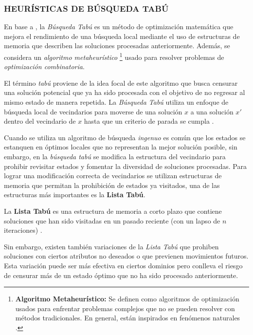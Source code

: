 \subsubsection{HEURÍSTICAS DE BÚSQUEDA TABÚ}

En base a \parencite{Gendreau2003}, la \textit{Búsqueda Tabú} es un método de optimización matemática que mejora el rendimiento de una búsqueda local mediante el uso de estructuras de memoria que describen las soluciones procesadas anteriormente. Además, se considera un \textit{algoritmo metaheurístico} \footnote{\textbf{Algoritmo Metaheurístico: }Se definen como algoritmos de optimización usados para enfrentar problemas complejos que no se pueden resolver con métodos tradicionales. En general, están inspirados en fenómenos naturales \parencite{almufti2023overview}.} usado para resolver problemas de \textit{optimización combinatoria}.

El término \textit{tabú} proviene de la idea focal de este algoritmo que busca censurar una solución potencial que ya ha sido procesada con el objetivo de no regresar al mismo estado de manera repetida. La \textit{Búsqueda Tabú} utiliza un enfoque de búsqueda local de vecindarios para moverse de una solución $x$ a una solución $x'$ dentro del vecindario de $x$ hasta que un criterio de parada se cumpla \parencite{Cvijović2002}. 

Cuando se utiliza un algoritmo de búsqueda \textit{ingenuo} es común que los estados se estanquen en óptimos locales que no representan la mejor solución posible, sin embargo, en la \textit{búsqueda tabú} se modifica la estructura del vecindario para prohibir revisitar estados y fomentar la diversidad de soluciones procesadas. Para lograr una modificación correcta de vecindarios se utilizan estructuras de memoria que permitan la prohibición de estados ya visitados, una de las estructuras más importantes es la \textbf{Lista Tabú}.

\begin{definition}
    La \textbf{Lista Tabú} es una estructura de memoria a corto plazo  que contiene soluciones que han sido visitadas en un pasado reciente (con un lapso de $n$ iteraciones) \parencite{Gendreau2003}.
\end{definition}

Sin embargo, existen también variaciones de la \textit{Lista Tabú} que prohiben soluciones con ciertos atributos no deseados o que previenen movimientos futuros. Esta variación puede ser más efectiva en ciertos dominios pero conlleva el riesgo de censurar más de un estado óptimo que no ha sido procesado anteriormente.

